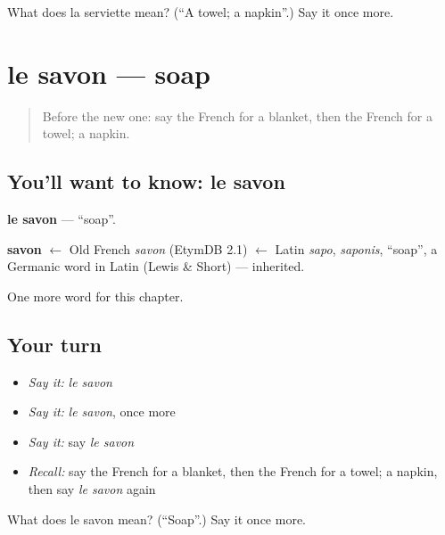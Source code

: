 \begin{tcolorbox}[breakable,colback=teal!4,colframe=teal!35!black,title={Before you move on}]
What does la serviette mean? (\textquotedblleft{}A towel; a napkin\textquotedblright{}.) Say it once more.
\end{tcolorbox}
\section[le savon]{le savon — soap}

\label{lesson:FR-C113-savon}



\begin{quote}
Before the new one: say the French for a blanket, then the French for a towel; a napkin.
\end{quote}

\subsection*{You'll want to know: le savon}
\textbf{le savon} — \textquotedblleft{}soap\textquotedblright{}.

\begin{cousinweb}
\textbf{savon} $\leftarrow$ Old French \emph{savon} (EtymDB 2.1) $\leftarrow$ Latin \emph{sapo}, \emph{saponis}, \textquotedblleft{}soap\textquotedblright{}, a Germanic word in Latin (Lewis \& Short) — inherited.
\end{cousinweb}

\begin{grammarlens}[title={What you've built}]
One more word for this chapter.
\end{grammarlens}

\subsection*{Your turn}
\begin{itemize}
\raggedright
  \item \emph{Say it:} \emph{le savon}
  \item \emph{Say it:} \emph{le savon}, once more
  \item \emph{Say it:} say \emph{le savon}
  \item \emph{Recall:} say the French for a blanket, then the French for a towel; a napkin, then say \emph{le savon} again
\end{itemize}

\begin{tcolorbox}[breakable,colback=teal!4,colframe=teal!35!black,title={Before you move on}]
What does le savon mean? (\textquotedblleft{}Soap\textquotedblright{}.) Say it once more.
\end{tcolorbox}
